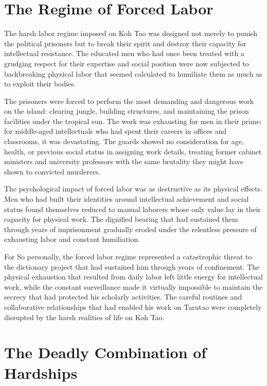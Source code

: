 \documentclass[
  Letterpaper,
]{scrbook}
\begin{document}
\section{The Regime of Forced Labor}\label{the-regime-of-forced-labor}

The harsh labor regime imposed on Koh Tao was designed not merely to
punish the political prisoners but to break their spirit and destroy
their capacity for intellectual resistance. The educated men who had
once been treated with a grudging respect for their expertise and social
position were now subjected to backbreaking physical labor that seemed
calculated to humiliate them as much as to exploit their bodies.

The prisoners were forced to perform the most demanding and dangerous
work on the island: clearing jungle, building structures, and
maintaining the prison facilities under the tropical sun. The work was
exhausting for men in their prime; for middle-aged intellectuals who had
spent their careers in offices and classrooms, it was devastating. The
guards showed no consideration for age, health, or previous social
status in assigning work details, treating former cabinet ministers and
university professors with the same brutality they might have shown to
convicted murderers.

The psychological impact of forced labor was as destructive as its
physical effects. Men who had built their identities around intellectual
achievement and social status found themselves reduced to manual
laborers whose only value lay in their capacity for physical work. The
dignified bearing that had sustained them through years of imprisonment
gradually eroded under the relentless pressure of exhausting labor and
constant humiliation.

For So personally, the forced labor regime represented a catastrophic
threat to the dictionary project that had sustained him through years of
confinement. The physical exhaustion that resulted from daily labor left
little energy for intellectual work, while the constant surveillance
made it virtually impossible to maintain the secrecy that had protected
his scholarly activities. The careful routines and collaborative
relationships that had enabled his work on Tarutao were completely
disrupted by the harsh realities of life on Koh Tao.

\section{The Deadly Combination of
Hardships}\label{the-deadly-combination-of-hardships}
\end{document}
